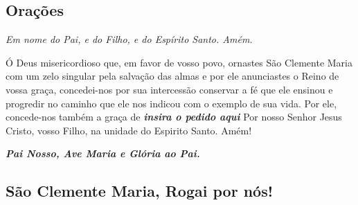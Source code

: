 \documentclass[18pt]{article}
\begin{document}
\begin{justify}

\newpage
\begin{center}
 \section{Orações}\label{sec:Orações} %
\textit{Em nome do Pai, e do Filho, e do Espírito Santo. Amém.}
\end{center}

Ó Deus misericordioso que, em favor de vosso povo, ornastes São Clemente Maria com um zelo singular pela salvação das almas e por ele anunciastes o Reino de vossa graça, concedei-nos por sua intercessão conservar a fé que ele ensinou e progredir no caminho que ele nos indicou com o exemplo de sua vida. Por ele, concede-nos também a graça de \textit{\textbf{insira o pedido aqui}} Por nosso Senhor Jesus Cristo, vosso Filho, na unidade do Espirito Santo. Amém!

\begin{center}
\textbf{\textit{Pai Nosso, Ave Maria e Glória ao Pai.}}
\end{center}

\vfill

\begin{center}
\section*{São Clemente Maria, Rogai por nós!}
\end{center}

\vfill


\end{justify}
\end{document}
